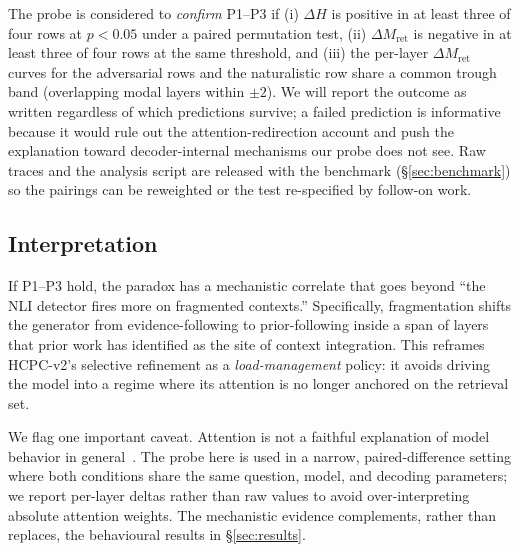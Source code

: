 The probe is considered to \emph{confirm} P1--P3 if (i) $\Delta H$ is
positive in at least three of four rows at $p < 0.05$ under a paired
permutation test, (ii) $\Delta M_{\text{ret}}$ is negative in at least
three of four rows at the same threshold, and (iii) the per-layer
$\Delta M_{\text{ret}}$ curves for the adversarial rows and the
naturalistic row share a common trough band (overlapping modal layers
within $\pm 2$). We will report the outcome as written regardless of
which predictions survive; a failed prediction is informative because it
would rule out the attention-redirection account and push the
explanation toward decoder-internal mechanisms our probe does not see.
Raw traces and the analysis script are released with the benchmark
(§\ref{sec:benchmark}) so the pairings can be reweighted or the test
re-specified by follow-on work.



\subsection{Interpretation}

If P1--P3 hold, the paradox has a mechanistic correlate that goes beyond
``the NLI detector fires more on fragmented contexts.'' Specifically,
fragmentation shifts the generator from evidence-following to
prior-following inside a span of layers that prior work has identified as
the site of context integration. This reframes HCPC-v2's selective
refinement as a \emph{load-management} policy: it avoids driving the
model into a regime where its attention is no longer anchored on the
retrieval set.

We flag one important caveat. Attention is not a faithful explanation of
model behavior in general~\citep{jain2019attention,wiegreffe2019attention}.
The probe here is used in a narrow, paired-difference setting where both
conditions share the same question, model, and decoding parameters; we
report per-layer deltas rather than raw values to avoid over-interpreting
absolute attention weights. The mechanistic evidence complements, rather
than replaces, the behavioural results in §\ref{sec:results}.
